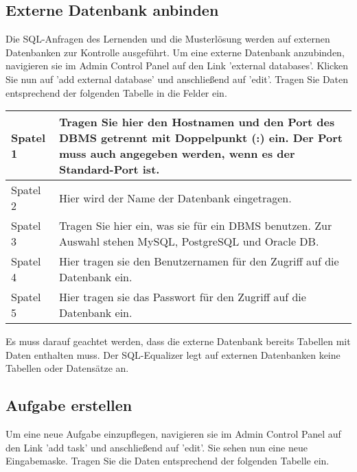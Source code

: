 \subsection{Externe Datenbank anbinden}

Die SQL-Anfragen des Lernenden und die Musterlösung werden auf externen Datenbanken zur Kontrolle ausgeführt. Um eine externe Datenbank anzubinden, navigieren sie im Admin Control Panel auf den Link 'external databases'. Klicken Sie nun auf 'add external database' und anschließend auf 'edit'.  Tragen Sie Daten entsprechend der folgenden Tabelle in die Felder ein.

\begin{tabular}{|l|p{14cm}|}\hline
Spatel 1 & Tragen Sie hier den Hostnamen und den Port des DBMS getrennt mit Doppelpunkt (:) ein. Der Port muss auch angegeben werden, wenn es der Standard-Port ist.\\\hline
Spatel 2 & Hier wird der Name der Datenbank eingetragen.\\\hline
Spatel 3 & Tragen Sie hier ein, was sie für ein DBMS benutzen. Zur Auswahl stehen MySQL, PostgreSQL und Oracle DB.\\\hline
Spatel 4 & Hier tragen sie den Benutzernamen für den Zugriff auf die Datenbank ein.\\\hline
Spatel 5 & Hier tragen sie das Passwort für den Zugriff auf die Datenbank ein.\\\hline
\end{tabular}

Es muss darauf geachtet werden, dass die externe Datenbank bereits Tabellen mit Daten enthalten muss. Der SQL-Equalizer legt auf externen Datenbanken keine Tabellen oder Datensätze an.

\subsection{Aufgabe erstellen}

Um eine neue Aufgabe einzupflegen, navigieren sie im Admin Control Panel auf den Link 'add task' und anschließend auf 'edit'. Sie sehen nun eine neue Eingabemaske. Tragen Sie die Daten entsprechend der folgenden Tabelle ein.

